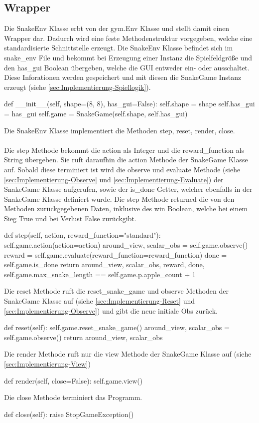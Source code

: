 \subsection{Wrapper}
Die SnakeEnv Klasse erbt von der gym.Env Klasse und stellt damit einen Wrapper dar. Dadurch wird eine feste Methodenstruktur vorgegeben, welche eine standardisierte Schnittstelle erzeugt. Die SnakeEnv Klasse befindet sich im snake\_env File und bekommt bei Erzeugung einer Instanz die Spielfeldgröße und den has\_gui Boolean übergeben, welche die GUI entweder ein- oder ausschaltet. Diese Inforationen werden gespeichert und mit diesen die SnakeGame Instanz erzeugt (siehe \ref{sec:Implementierung-Spiellogik}).
\begin{python}
	def __init__(self, shape=(8, 8), has_gui=False):
		self.shape = shape
		self.has_gui = has_gui
		self.game = SnakeGame(self.shape, self.has_gui)
\end{python}
Die SnakeEnv Klasse implementiert die Methoden step, reset, render, close.\\
\\ Die step Methode bekommt die action als Integer und die reward\_function als String übergeben. Sie ruft daraufhin die action Methode der SnakeGame Klasse auf. Sobald diese terminiert ist wird die observe und evaluate Methode (siehe \ref{sec:Implementierung-Observe} und \ref{sec:Implementierung-Evaluate}) der SnakeGame Klasse aufgerufen, sowie der is\_done Getter, welcher ebenfalls in der SnakeGame Klasse definiert wurde. Die step Methode returned die von den Methoden zurückgegebenen Daten, inklusive des win Boolean, welche bei einem Sieg True und bei Verlust False zurückgibt.
\begin{python}
	def step(self, action, reward_function="standard"):
		self.game.action(action=action)
		around_view, scalar_obs = self.game.observe()
		reward = self.game.evaluate(reward_function=reward_function)
		done = self.game.is_done
		return around_view, scalar_obs, reward, done, self.game.max_snake_length == self.game.p.apple_count + 1
\end{python}
Die reset Methode ruft die reset\_snake\_game und observe Methoden der SnakeGame Klasse auf (siehe \ref{sec:Implementierung-Reset} und \ref{sec:Implementierung-Observe}) und gibt die neue initiale Obs zurück.
\begin{python}
	def reset(self):
		self.game.reset_snake_game()
		around_view, scalar_obs = self.game.observe()
		return around_view, scalar_obs
\end{python}
Die render Methode ruft nur die view Methode der SnakeGame Klasse auf (siehe \ref{sec:Implementierung-View})
\begin{python}
	def render(self, close=False):
		self.game.view()
\end{python}
Die close Methode terminiert das Programm.
\begin{python}
	def close(self):
		raise StopGameException()
\end{python}

